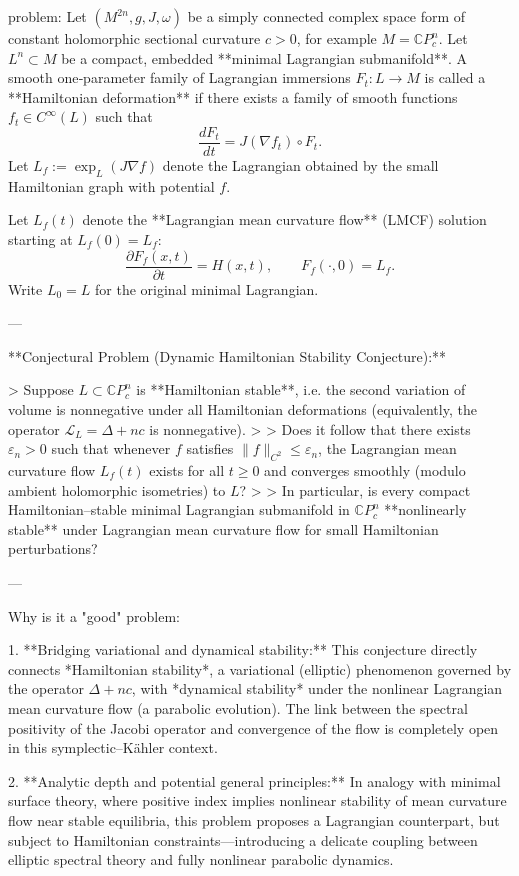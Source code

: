 problem:  
Let \( (M^{2n}, g, J, \omega) \) be a simply connected complex space form of constant holomorphic sectional curvature \(c>0\), for example \(M = \mathbb{C}P^n_c\).  
Let \(L^n \subset M\) be a compact, embedded **minimal Lagrangian submanifold**.  
A smooth one‑parameter family of Lagrangian immersions \(F_t: L \to M\) is called a **Hamiltonian deformation** if there exists a family of smooth functions \(f_t \in C^\infty(L)\) such that
\[
\frac{dF_t}{dt} = J(\nabla f_t) \circ F_t .
\]
Let \(L_f := \exp_L(J\nabla f)\) denote the Lagrangian obtained by the small Hamiltonian graph with potential \(f\).

Let \(L_f(t)\) denote the **Lagrangian mean curvature flow** (LMCF) solution starting at \(L_f(0)=L_f\):
\[
\frac{\partial F_f(x,t)}{\partial t} = H(x,t), \qquad F_f(\cdot,0) = L_f.
\]
Write \(L_0=L\) for the original minimal Lagrangian.

---

**Conjectural Problem (Dynamic Hamiltonian Stability Conjecture):**  

> Suppose \( L \subset \mathbb{C}P^n_c \) is **Hamiltonian stable**, i.e. the second variation of volume is nonnegative under all Hamiltonian deformations (equivalently, the operator \(\mathcal{L}_L = \Delta + nc\) is nonnegative).  
> 
> Does it follow that there exists \(\varepsilon_n>0\) such that whenever \(f\) satisfies \(\|f\|_{C^2}\le \varepsilon_n\), the Lagrangian mean curvature flow \(L_f(t)\) exists for all \( t \ge 0 \) and converges smoothly (modulo ambient holomorphic isometries) to \(L\)?
> 
> In particular, is every compact Hamiltonian–stable minimal Lagrangian submanifold in \(\mathbb{C}P^n_c\) **nonlinearly stable** under Lagrangian mean curvature flow for small Hamiltonian perturbations?

---

Why is it a "good" problem:  

1. **Bridging variational and dynamical stability:**  
   This conjecture directly connects *Hamiltonian stability*, a variational (elliptic) phenomenon governed by the operator \(\Delta + nc\), with *dynamical stability* under the nonlinear Lagrangian mean curvature flow (a parabolic evolution). The link between the spectral positivity of the Jacobi operator and convergence of the flow is completely open in this symplectic–Kähler context.

2. **Analytic depth and potential general principles:**  
   In analogy with minimal surface theory, where positive index implies nonlinear stability of mean curvature flow near stable equilibria, this problem proposes a Lagrangian counterpart, but subject to Hamiltonian constraints—introducing a delicate coupling between elliptic spectral theory and fully nonlinear parabolic dynamics.

